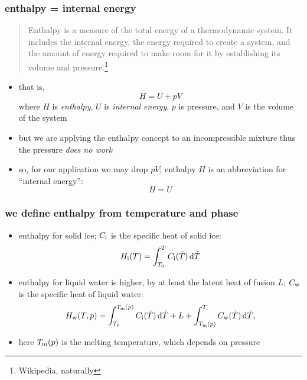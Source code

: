 \documentclass{beamer}
\begin{document}
\begin{frame}
  \frametitle{enthalpy = internal energy}
\small
  
\begin{quote}
Enthalpy is a measure of the total energy of a thermodynamic system.  It includes the internal energy, the energy required to create a system, and the amount of energy required to make room for it by establishing its volume and pressure.\footnote{\tiny Wikipedia, naturally}
\end{quote}
\begin{itemize}
\item that is,
	$$H = U + p V$$
where $H$ is \emph{enthalpy}, $U$ is \emph{internal energy}, $p$ is pressure, and $V$ is the volume of the system
\item but we are applying the enthalpy concept to an incompressible mixture thus the pressure \emph{does no work}
\item so, for our application we may drop $pV$; enthalpy $H$ is an abbreviation for ``internal energy'':
	$$H = U$$
\end{itemize}
\end{frame}


\begin{frame}
  \frametitle{we define enthalpy from temperature and phase}

\begin{itemize}
\item enthalpy for solid ice; $C_{\text i}$ is the specific heat of solid ice:
\begin{equation*}
  H_{\text i}(T) = \int_{T_0}^{T} C_{\text i}(\tilde T)\,\mathrm{d} \tilde T
\end{equation*}
\item enthalpy for liquid water is higher, by at least the latent heat of fusion $L$; $C_{\text w}$ is the specific heat of liquid water:
\begin{equation*}
  H_{\text w}(T,p) = \int_{T_0}^{T_{\text m}(p)} C_{\text i}(\tilde T)\,\mathrm{d} \tilde T + L + \int_{T_{\text m}(p)}^{T} C_{\text w} (\tilde T)\, \mathrm{d} \tilde T,
\end{equation*}
\item here $T_{\text m}(p)$ is the melting temperature, which depends on pressure
\end{itemize}
\end{frame}
\end{document}
